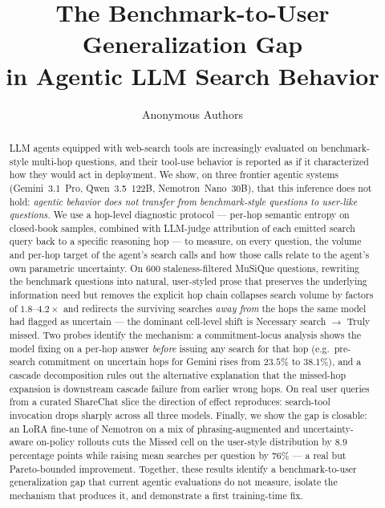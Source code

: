 \documentclass[10pt,letterpaper]{article}
\title{\textbf{The Benchmark-to-User Generalization Gap\\
in Agentic LLM Search Behavior}}
\author{Anonymous Authors}
\affil{Paper under double-blind review at ICLR 2026}
\date{}
\begin{document}
\maketitle

\begin{abstract}
LLM agents equipped with web-search tools are increasingly evaluated on
benchmark-style multi-hop questions, and their tool-use behavior is reported as if it
characterized how they would act in deployment. We show, on three frontier agentic
systems (Gemini~3.1~Pro, Qwen~3.5~122B, Nemotron~Nano~30B), that this inference does
not hold: \emph{agentic behavior does not transfer from benchmark-style questions to
user-like questions.} We use a hop-level diagnostic protocol --- per-hop semantic
entropy \citep{farquhar2024} on closed-book samples, combined with LLM-judge
attribution of each emitted search query back to a specific reasoning hop --- to
measure, on every question, the volume and per-hop target of the agent's search
calls and how those calls relate to the agent's own parametric uncertainty. On 600
staleness-filtered MuSiQue \citep{musique} questions, rewriting the benchmark
questions into natural, user-styled prose that preserves the underlying information
need but removes the explicit hop chain collapses search volume by factors of
$1.8$--$4.2{\times}$ and redirects the surviving searches \emph{away from} the hops
the same model had flagged as uncertain --- the dominant cell-level shift is
Necessary search $\to$ Truly missed. Two probes identify the mechanism: a
commitment-locus analysis shows the model fixing on a per-hop answer \emph{before}
issuing any search for that hop (e.g.\ pre-search commitment on uncertain hops for
Gemini rises from $23.5\%$ to $38.1\%$), and a cascade decomposition rules out the alternative
explanation that the missed-hop expansion is downstream cascade failure from earlier
wrong hops. On real user queries from a curated ShareChat slice the direction of
effect reproduces: search-tool invocation drops sharply across all three models.
Finally, we show the gap is closable: an LoRA fine-tune of Nemotron on a mix of
phrasing-augmented and uncertainty-aware on-policy rollouts cuts the Missed cell on
the user-style distribution by $8.9$ percentage points while raising mean searches
per question by $76\%$ --- a real but Pareto-bounded improvement. Together, these
results identify a benchmark-to-user generalization gap that current agentic
evaluations do not measure, isolate the mechanism that produces it, and demonstrate
a first training-time fix.
\end{abstract}
\end{document}
